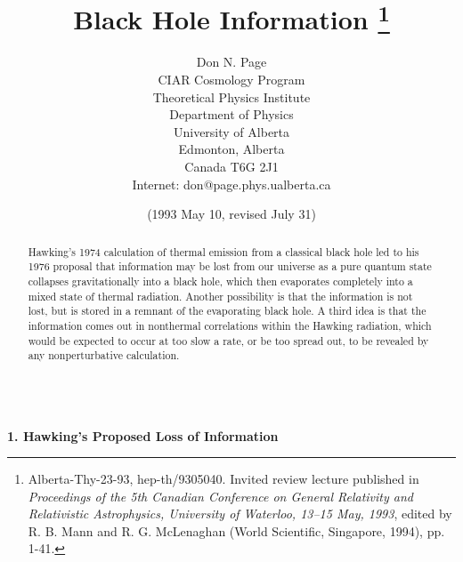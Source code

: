\documentclass[12pt]{article}
\begin{document}
\title{Black Hole Information \thanks
{Alberta-Thy-23-93, hep-th/9305040.
Invited review lecture published in {\em Proceedings of the
5th Canadian Conference on General Relativity and Relativistic
Astrophysics,
University of Waterloo, 13--15 May, 1993}, edited by R. B. Mann and
R. G. McLenaghan (World Scientific, Singapore, 1994), pp. 1-41.}}
\author{ Don N. Page\\
CIAR Cosmology Program\\
Theoretical Physics Institute\\
Department of Physics\\University of Alberta\\
Edmonton, Alberta\\Canada T6G 2J1\\
Internet:  don@page.phys.ualberta.ca}
\date{(1993 May 10, revised July 31)}
\maketitle
\large
\begin{abstract}

     Hawking's 1974 calculation of thermal emission
from a classical black hole led to his 1976 proposal
that information may be lost from our universe as a
pure quantum state collapses gravitationally into a
black hole, which then evaporates completely into
a mixed state of thermal radiation.  Another possibility
is that the information is not lost, but is stored in a
remnant of the evaporating black hole.  A third idea
is that the information comes out in nonthermal
correlations within the Hawking radiation, which
would be expected to occur at too slow a rate,
or be too spread out, to be revealed by any
nonperturbative calculation.
\\
\\
\end{abstract}
\normalsize
\pagebreak

\vspace{5 mm}
{\bf 1.  Hawking's Proposed Loss of Information}
\vspace{5 mm}
\end{document}
